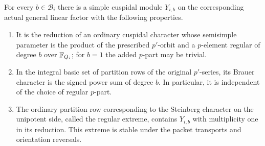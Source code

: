 \begin{lemma}\label{end:linear-cuspidals}
For every $b\in\mathcal B_i$ there is a simple cuspidal module
$Y_{i,b}$ on the corresponding actual general linear factor with
the following properties.
\begin{enumerate}
\item It is the reduction of an ordinary cuspidal character whose
semisimple parameter is the product of the prescribed $p'$-orbit
and a $p$-element regular of degree $b$ over $\mathbb F_{Q_i}$; for $b=1$
the added $p$-part may be trivial.
\item In the integral basic set of partition rows of the original
$p'$-series, its Brauer character is the signed power sum of degree
$b$.  In particular, it is independent of the choice of regular
$p$-part.
\item The ordinary partition row corresponding to the Steinberg
character on the unipotent side, called the regular extreme,
contains $Y_{i,b}$ with multiplicity one in its reduction.
This extreme is stable
under the packet transports and orientation reversals.
\end{enumerate}
\end{lemma}

